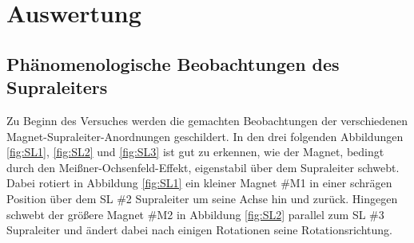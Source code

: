 \section{Auswertung}
\label{sec:Auswertung}

\subsection{Phänomenologische Beobachtungen des Supraleiters}
\label{sec:beo}
Zu Beginn des Versuches werden die gemachten Beobachtungen der verschiedenen
Magnet-Supraleiter-Anordnungen geschildert. In den drei folgenden Abbildungen
\ref{fig:SL1}, \ref{fig:SL2} und \ref{fig:SL3} ist gut zu erkennen,
wie der Magnet, bedingt durch den Meißner-Ochsenfeld-Effekt, eigenstabil über dem
Supraleiter schwebt. Dabei rotiert in Abbildung \ref{fig:SL1} ein kleiner Magnet
\#M1 in einer schrägen Position über dem SL \#2 Supraleiter um seine Achse hin und zurück.
Hingegen schwebt der größere Magnet \#M2 in Abbildung \ref{fig:SL2} parallel
zum SL \#3 Supraleiter und ändert dabei nach einigen Rotationen seine Rotationsrichtung.

